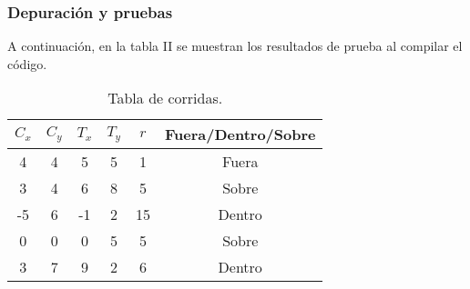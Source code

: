 \subsubsection{Depuración y pruebas}
A continuación, en la tabla II se muestran los resultados de prueba al compilar el código.\\

\begin{table}[!ht]
\label{T:equipos}
\begin{center}
\begin{tabular}{| c | c | c | c | c | c |}
\hline
\textbf{$C_x$} & \textbf{$C_y$} & \textbf{$T_x$} & \textbf{$T_y$} & \textbf{$r$} & \textbf{Fuera/Dentro/Sobre}\\
\hline
4 & 4 & 5 & 5 & 1 & Fuera \\
3 & 4 & 6 & 8 & 5 & Sobre \\
-5 & 6 & -1 & 2 & 15 & Dentro \\
0 & 0 & 0 & 5 & 5 & Sobre\\
3 & 7 & 9 & 2 & 6 & Dentro\\
\hline
\end{tabular}
\caption{Tabla de corridas.}
\end{center}
\end{table}
